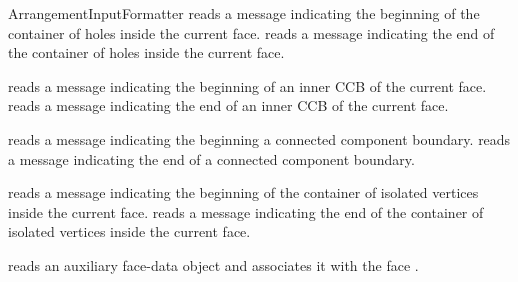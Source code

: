 \begin{ccRefConcept}{ArrangementInputFormatter}
    {reads a message indicating the beginning of the container of holes inside the
     current face.}
\ccGlue
{}
    {reads a message indicating the end of the container of holes inside the
     current face.}

    {reads a message indicating the beginning of an inner CCB of the current face.}
\ccGlue
{}
    {reads a message indicating the end of an inner CCB of the current face.}

    {reads a message indicating the beginning a connected component boundary.}
\ccGlue
{}
    {reads a message indicating the end of a connected component boundary.}

    {reads a message indicating the beginning of the container of isolated vertices
     inside the current face.}
\ccGlue
{}
    {reads a message indicating the end of the container of isolated vertices inside
     the current face.}

    {reads an auxiliary face-data object and associates it with the face .}

\ccHasModels

\\
\\

\end{ccRefConcept}

\ccRefPageEnd

